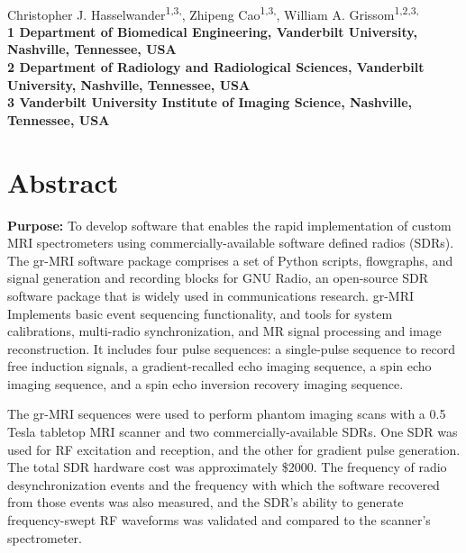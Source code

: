 \documentclass[10pt,letterpaper]{article}
\date{}
\begin{document}
\vspace*{0.35in}

\begin{flushleft}
{\Large
\textbf{}
}
\newline
\\
Christopher J. Hasselwander\textsuperscript{1,3,\Yinyang},
Zhipeng Cao\textsuperscript{1,3,\ddag},
William A. Grissom\textsuperscript{1,2,3,\Yinyang}
\\
\bigskip
\bf{1} Department of Biomedical Engineering, Vanderbilt University, Nashville, Tennessee, USA
\\
\bf{2} Department of Radiology and Radiological Sciences, Vanderbilt University, Nashville, Tennessee, USA
\\
\bf{3} Vanderbilt University Institute of Imaging Science, Nashville, Tennessee, USA
\\
\bigskip

\end{flushleft}
\section*{Abstract}
{\bf Purpose:} To develop software that enables the rapid implementation of custom MRI spectrometers using commercially-available software defined radios (SDRs).\\[1em]

 The gr-MRI software package comprises a set of Python scripts, flowgraphs, and 
signal generation and recording blocks for GNU Radio, 
an open-source SDR software package that is widely used in communications research. 
gr-MRI Implements basic event sequencing functionality, 
and tools for system calibrations, multi-radio synchronization, and 
MR signal processing and image reconstruction. 
It includes four pulse sequences: 
a single-pulse sequence to record free induction signals, 
a gradient-recalled echo imaging sequence, a spin echo imaging sequence,
and a spin echo inversion recovery imaging sequence.

\par The gr-MRI sequences were used to perform phantom imaging scans with a 0.5 Tesla 
tabletop MRI scanner and two commercially-available SDRs.
One SDR was used for RF excitation and reception, and the other for gradient pulse generation. 
The total SDR hardware cost was approximately \$2000.
The frequency of radio desynchronization events and the frequency with which the software recovered from those events was also measured,
and
the SDR's ability to generate frequency-swept RF waveforms was 
validated and compared to the scanner's spectrometer.\\[1em]
\end{document}
